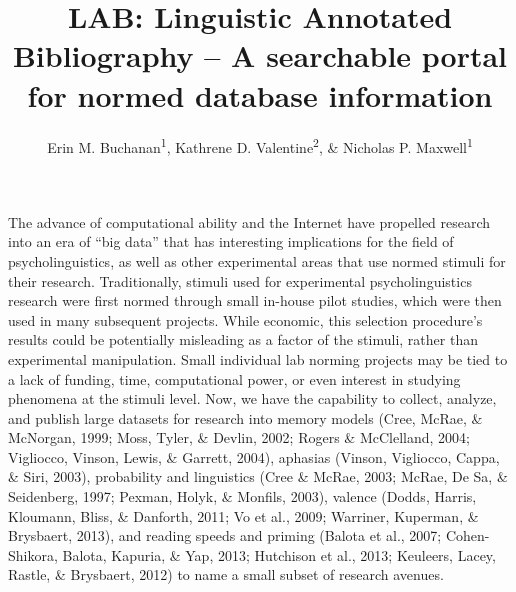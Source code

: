 \documentclass[english,man]{apa6}
\title{LAB: Linguistic Annotated Bibliography -- A searchable portal for normed
database information}
\author{Erin M. Buchanan\textsuperscript{1}, Kathrene D. Valentine\textsuperscript{2}, \& Nicholas P. Maxwell\textsuperscript{1}}
\affiliation{
    \vspace{0.5cm}
          \textsuperscript{1} Missouri State University\\
          \textsuperscript{2} University of Missouri  }
\theoremstyle{definition}
\theoremstyle{definition}
\theoremstyle{definition}
\theoremstyle{remark}
\begin{document}
\maketitle

\setcounter{secnumdepth}{0}



The advance of computational ability and the Internet have propelled
research into an era of \enquote{big data} that has interesting
implications for the field of psycholinguistics, as well as other
experimental areas that use normed stimuli for their research.
Traditionally, stimuli used for experimental psycholinguistics research
were first normed through small in-house pilot studies, which were then
used in many subsequent projects. While economic, this selection
procedure's results could be potentially misleading as a factor of the
stimuli, rather than experimental manipulation. Small individual lab
norming projects may be tied to a lack of funding, time, computational
power, or even interest in studying phenomena at the stimuli level. Now,
we have the capability to collect, analyze, and publish large datasets
for research into memory models (Cree, McRae, \& McNorgan, 1999; Moss,
Tyler, \& Devlin, 2002; Rogers \& McClelland, 2004; Vigliocco, Vinson,
Lewis, \& Garrett, 2004), aphasias (Vinson, Vigliocco, Cappa, \& Siri,
2003), probability and linguistics (Cree \& McRae, 2003; McRae, De Sa,
\& Seidenberg, 1997; Pexman, Holyk, \& Monfils, 2003), valence (Dodds,
Harris, Kloumann, Bliss, \& Danforth, 2011; Vo et al., 2009; Warriner,
Kuperman, \& Brysbaert, 2013), and reading speeds and priming (Balota et
al., 2007; Cohen-Shikora, Balota, Kapuria, \& Yap, 2013; Hutchison et
al., 2013; Keuleers, Lacey, Rastle, \& Brysbaert, 2012) to name a small
subset of research avenues.
\end{document}
